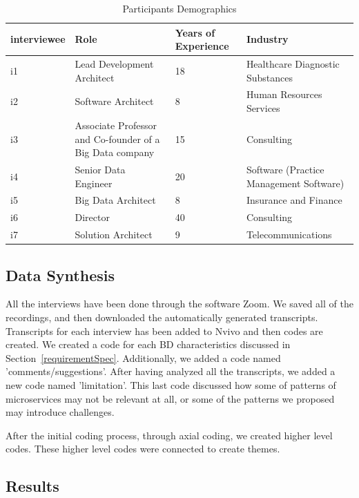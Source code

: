 \documentclass{bmcart}
\begin{document}
\begin{table}[h]
  \renewcommand{\arraystretch}{1.5}
  \caption[]{Participants Demographics}
  \begin{tabular}{|p{1.4cm}|p{4cm}|p{1.5cm}|p{2.5cm}|}
      \hline
      interviewee & Role & Years of Experience  & Industry \\  

      \hline
      i1 & Lead Development Architect & 18 &  Healthcare Diagnostic Substances \\   
      \hline
      i2 & Software Architect & 8 &  Human Resources Services  \\   
      \hline
      i3 & Associate Professor and Co-founder of a Big Data company & 15 &  Consulting \\   
      \hline
      i4 & Senior Data Engineer & 20 &  Software (Practice Management Software) \\   
      \hline
      i5 & Big Data Architect & 8 &  Insurance and Finance \\   
      \hline
      i6 & Director & 40 &  Consulting \\   
      \hline
      i7 & Solution Architect & 9 &  Telecommunications \\   
      \hline
      
  \end{tabular}
  \label{interviewees}
\end{table}


\subsection{Data Synthesis}

All the interviews have been done through the software Zoom. We saved all of the recordings, and then downloaded the automatically generated transcripts. Transcripts for each interview has been added to Nvivo and then codes are created. We created a code for each BD characteristics discussed in Section~\ref{requirementSpec}. Additionally, we added a code named 'comments/suggestions'. After having analyzed all the transcripts, we added a new code named 'limitation'. This last code discussed how some of patterns of microservices may not be relevant at all, or some of the patterns we proposed may introduce challenges. 

After the initial coding process, through axial coding, we created higher level codes. These higher level codes were connected to create themes. 


\subsection{Results}
\end{document}
